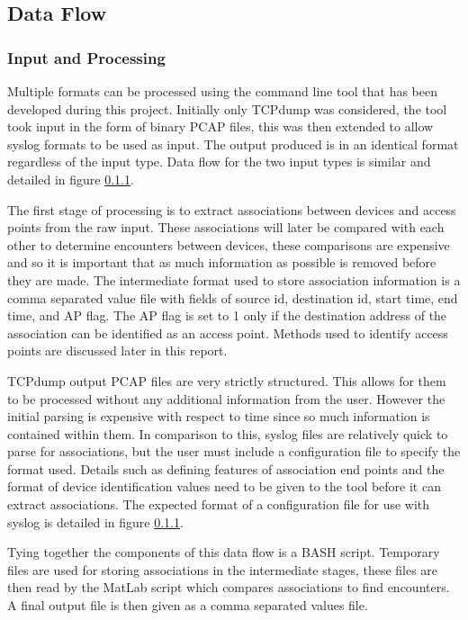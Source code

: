 \subsection{Data Flow}

\subsubsection{Input and Processing}
Multiple formats can be processed using the command line tool that has been developed during this project. Initially only TCPdump was considered, the tool took input in the form of binary PCAP files, this was then extended to allow syslog formats to be used as input. The output produced is in an identical format regardless of the input type. Data flow for the two input types is similar and detailed in figure \ref{}.\newline

The first stage of processing is to extract associations between devices and access points from the raw input. These associations will later be compared with each other to determine encounters between devices, these comparisons are expensive and so it is important that as much information as possible is removed before they are made. The intermediate format used to store association information is  a comma separated value file with fields of source id, destination id, start time, end time, and AP flag. The AP flag is set to 1 only if the destination address of the association can be identified as an access point. Methods used to identify access points are discussed later in this report.

TCPdump output PCAP files are very strictly structured. This allows for them to be processed without any additional information from the user. However the initial parsing is expensive with respect to time since so much information is contained within them. In comparison to this, syslog files are relatively quick to parse for associations, but the user must include a configuration file to specify the format used. Details such as defining features of association end points and the format of device identification values need to be given to the tool before it can extract associations. The expected format of a configuration file for use with syslog is detailed in figure \ref{}.\newline

Tying together the components of this data flow is a BASH script. Temporary files are used for storing associations in the intermediate stages, these files are then read by the MatLab script which compares associations to find encounters. A final output file is then given as a comma separated values file. 

